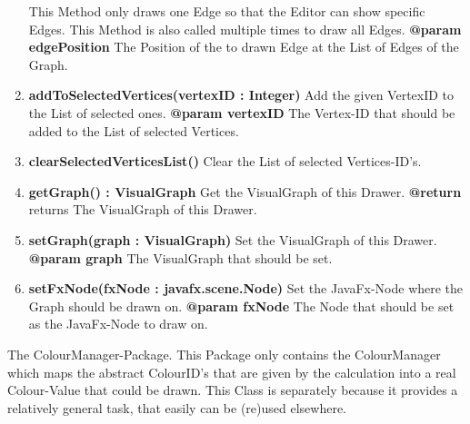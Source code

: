 \begin{enumerate}[+]
{						This Method only draws one Edge so that the Editor can show specific Edges.
						This Method is also called multiple times to draw all Edges.
						\newline
						\textbf{@param edgePosition}
						The Position of the to drawn Edge at the List of Edges of the Graph.
						\newline
					}
					\item{
						\textbf{addToSelectedVertices(vertexID : Integer)} \newline
						Add the given VertexID to the List of selected ones.
						\newline
						\textbf{@param vertexID}
						The Vertex-ID that should be added to the List of selected Vertices.
						\newline
					}
					\item{
						\textbf{clearSelectedVerticesList()} \newline
						Clear the List of selected Vertices-ID's.
						\newline
					}
					\item{
						\textbf{getGraph() : VisualGraph} \newline
						Get the VisualGraph of this Drawer.
						\newline
						\textbf{@return} returns
							The VisualGraph of this Drawer.
							\newline
					}
					\item{
						\textbf{setGraph(graph : VisualGraph)} \newline
						Set the VisualGraph of this Drawer.
						\newline
						\textbf{@param graph}
							The VisualGraph that should be set.
							\newline
					}
					\item{
						\textbf{setFxNode(fxNode : javafx.scene.Node)} \newline
						Set the JavaFx-Node where the Graph should be drawn on.
						\newline
						\textbf{@param fxNode}
						The  Node that should be set as the JavaFx-Node to draw on.
						\newline
					}
				\end{enumerate}
	
		The ColourManager-Package.
		This Package only contains the ColourManager which maps the abstract ColourID's that are given by the calculation into a real Colour-Value that could be drawn.
		This Class is separately because it provides a relatively general task, that easily can be (re)used elsewhere.
		
